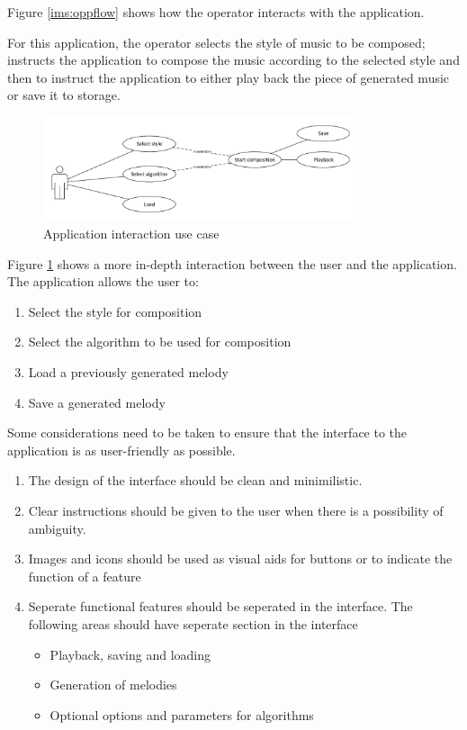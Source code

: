 Figure \ref{ims:oppflow} shows how the operator interacts with the application. 

For this application, the operator selects the style of music to be composed; instructs the application to compose the music according to the selected style and then to instruct the application to either play back the piece of generated music or save it to storage.

\begin{figure}
\centerline{\includegraphics[width=350px]{../images/op_use_case.pdf}}
\caption{Application interaction use case}
\label{ims:opusecase}
\end{figure}

Figure \ref{ims:opusecase} shows a more in-depth interaction between the user and the application. 
The application allows the user to:
\begin{enumerate}
\item Select the style for composition
\item Select the algorithm to be used for composition
\item Load a previously generated melody
\item Save a generated melody
\end{enumerate}

Some considerations need to be taken to ensure that the interface to the application is as user-friendly as possible. 

\begin{enumerate}
\item The design of the interface should be clean and minimilistic. 
\item Clear instructions should be given to the user when there is a possibility of ambiguity.
\item Images and icons should be used as visual aids for buttons or to indicate the function of a feature
\item Seperate functional features should be seperated in the interface. The following areas should have seperate section in the interface
	\begin{itemize}
	\item Playback, saving and loading
	\item Generation of melodies
	\item Optional options and parameters for algorithms
	\end{itemize} 
\end{enumerate}

